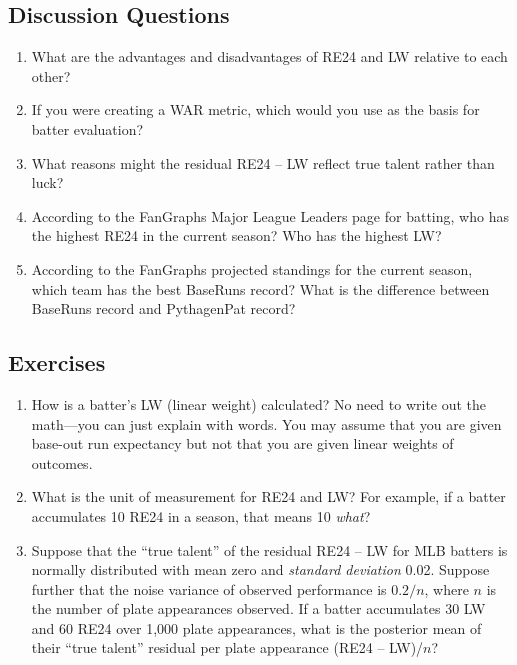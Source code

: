 \documentclass{article}
\begin{document}
    \subsection{\sc Discussion Questions}

      \begin{enumerate}
        \item What are the advantages and disadvantages of RE24 and LW relative to each other?
        \item If you were creating a WAR metric, which would you use as the basis for batter evaluation?
        \item What reasons might the residual RE24 -- LW reflect true talent rather than luck?
        \item According to the FanGraphs Major League Leaders page for batting, who has the highest RE24 in the current season? Who has the highest LW?
        \item According to the FanGraphs projected standings for the current season, which team has the best BaseRuns record? What is the difference between BaseRuns record and PythagenPat record?
      \end{enumerate}
    
    \subsection{\sc Exercises}

      \begin{enumerate}
        \item How is a batter's LW (linear weight) calculated? No need to write out the math---you can just explain with words. You may assume that you are given base-out run expectancy but not that you are given linear weights of outcomes.
        \item What is the unit of measurement for RE24 and LW? For example, if a batter accumulates 10 RE24 in a season, that means 10 {\it what}?
        \item Suppose that the ``true talent'' of the residual RE24 -- LW for MLB batters is normally distributed with mean zero and {\it standard deviation} 0.02. Suppose further that the noise variance of observed performance is $0.2/n$, where $n$ is the number of plate appearances observed. If a batter accumulates 30 LW and 60 RE24 over 1,000 plate appearances, what is the posterior mean of their ``true talent'' residual per plate appearance (RE24 -- LW)/$n$?
      \end{enumerate}
\end{document}
